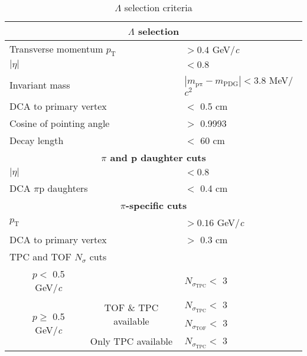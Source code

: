 \documentclass[ALICE,manyauthors]{cernphprep}
\newcommand{\Lam}{$\Lambda$\xspace}
\begin{document}
\begin{table}[htbp]
 \centering 
 \caption{\Lam selection criteria}
  \renewcommand{\arraystretch}{1.05}
  \begin{tabular}{lc|c|l}
   \hline  
   \multicolumn{4}{c}{\textbf{\Lam selection}} \\
   \hline
   \multicolumn{3}{l|}{Transverse momentum $p_{\mathrm{T}}$} & $> 0.4$ GeV/\textit{c} \\
   \hline
   \multicolumn{3}{l|}{$|\eta|$} & $< 0.8$ \\
   \hline
   \multicolumn{3}{l|}{Invariant mass} & $|m_{\mathrm{\mathrm{p}\pi}} - m_{\mathrm{PDG}}| < 3.8$ MeV/$c^{2}$ \\ 
   \hline
   \multicolumn{3}{l|}{DCA to primary vertex} & $<$ 0.5 cm \\
   \hline
   \multicolumn{3}{l|}{Cosine of pointing angle} & $>$ 0.9993 \\
   \hline
   \multicolumn{3}{l|}{Decay length} & $<$ 60 cm \\
   \hline
   
   
   \multicolumn{4}{c}{\textbf{$\pi$ and p daughter cuts}} \\
   \hline
   \multicolumn{3}{l|}{$|\eta|$} &  $< 0.8$ \\
   \hline
   \multicolumn{3}{l|}{DCA $\pi$p daughters} & $<$ 0.4 cm \\
   \hline
   
   
   \multicolumn{4}{c}{\textbf{$\pi$-specific cuts}} \\
   \hline
   \multicolumn{3}{l|}{$p_{\mathrm{T}}$} & $> 0.16$ GeV/\textit{c} \\
   \hline
   \multicolumn{3}{l|}{DCA to primary vertex} & $>$ 0.3 cm \\
   \hline
   \multicolumn{4}{l}{TPC and TOF $N_{\sigma}$ cuts} \\
   \cline{2-4}
    & \multicolumn{1}{c}{$p <$ 0.5 GeV/\textit{c}} &  & $N_{\sigma_{\mathrm{TPC}}} <$ 3 \\
   \cline{2-4}
    & \multicolumn{1}{c}{\multirow{3}{*}{$p \geq$ 0.5 GeV/\textit{c}}} &  \multirow{2}{*}{TOF \& TPC available} & $N_{\sigma_{\mathrm{TPC}}} <$ 3 \\
    & \multicolumn{2}{c|}{} & $N_{\sigma_{\mathrm{TOF}}} <$ 3 \\
   \cline{3-4}
    & \multicolumn{1}{c}{} & Only TPC available & $N_{\sigma_{\mathrm{TPC}}} <$ 3 \\
   \hline
   

\end{tabular}
\end{table}
\end{document}
